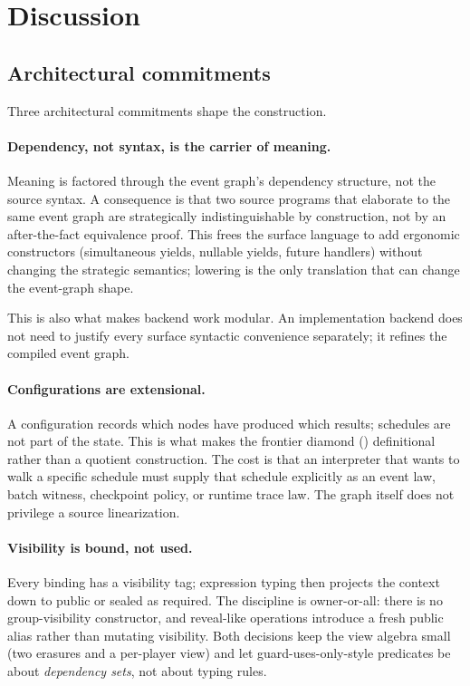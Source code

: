 \section{Discussion}
\label{sec:discussion}

\subsection{Architectural commitments}

Three architectural commitments shape the construction.

\paragraph{Dependency, not syntax, is the carrier of meaning.}
Meaning is factored through the event graph's dependency structure, not
the source syntax.  A consequence is that two source programs that
elaborate to the same event graph are strategically indistinguishable by
construction, not by an after-the-fact equivalence proof.  This frees the surface language to
add ergonomic constructors (simultaneous yields, nullable yields, future
handlers) without changing the strategic semantics; lowering is the only
translation that can change the event-graph shape.

This is also what makes backend work modular.  An implementation backend
does not need to justify every surface syntactic convenience separately;
it refines the compiled event graph.

\paragraph{Configurations are extensional.}
A configuration records which nodes have produced which results;
schedules are not part of the state.  This is what makes the
frontier diamond () definitional rather than a
quotient construction.  The cost is that an interpreter that wants
to walk a specific schedule must supply that schedule explicitly as an
event law, batch witness, checkpoint policy, or runtime trace law.  The
graph itself does not privilege a source linearization.

\paragraph{Visibility is bound, not used.}
Every binding has a visibility tag; expression typing then
projects the context down to public or sealed as required.  The
discipline is owner-or-all: there is no group-visibility
constructor, and reveal-like operations introduce a fresh public
alias rather than mutating visibility.  Both decisions keep the
view algebra small (two erasures and a per-player view) and let
guard-uses-only-style predicates be about \emph{dependency
sets}, not about typing rules.

